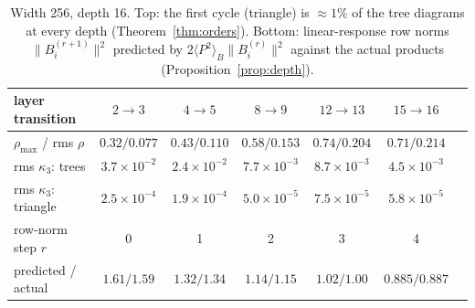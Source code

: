 \documentclass[11pt]{article}
\theoremstyle{definition}
\theoremstyle{remark}
\begin{document}
\begin{table}[h]\centering\small
\begin{tabular}{@{}lcccccc@{}}
\toprule
layer transition & $2\to3$ & $4\to5$ & $8\to9$ & $12\to13$ & $15\to16$\\
\midrule
$\rho_{\max}$ / rms $\rho$ & $0.32/0.077$ & $0.43/0.110$ & $0.58/0.153$ & $0.74/0.204$ & $0.71/0.214$\\
rms $\kappa_3$: trees & $3.7\times10^{-2}$ & $2.4\times10^{-2}$ & $7.7\times10^{-3}$ & $8.7\times10^{-3}$ & $4.5\times10^{-3}$\\
rms $\kappa_3$: triangle & $2.5\times10^{-4}$ & $1.9\times10^{-4}$ & $5.0\times10^{-5}$ & $7.5\times10^{-5}$ & $5.8\times10^{-5}$\\
\midrule
row-norm step $r$ & 0 & 1 & 2 & 3 & 4\\
predicted / actual & $1.61/1.59$ & $1.32/1.34$ & $1.14/1.15$ & $1.02/1.00$ & $0.885/0.887$\\
\bottomrule
\end{tabular}
\caption{Width 256, depth 16. Top: the first cycle (triangle) is $\approx1\%$ of the tree diagrams at every depth (Theorem~\ref{thm:orders}). Bottom: linear-response row norms $\|B^{(r+1)}_i\|^2$ predicted by $2\langle P^2\rangle_B\|B^{(r)}_i\|^2$ against the actual products (Proposition~\ref{prop:depth}).}\label{tab:cycles}
\end{table}
\end{document}
